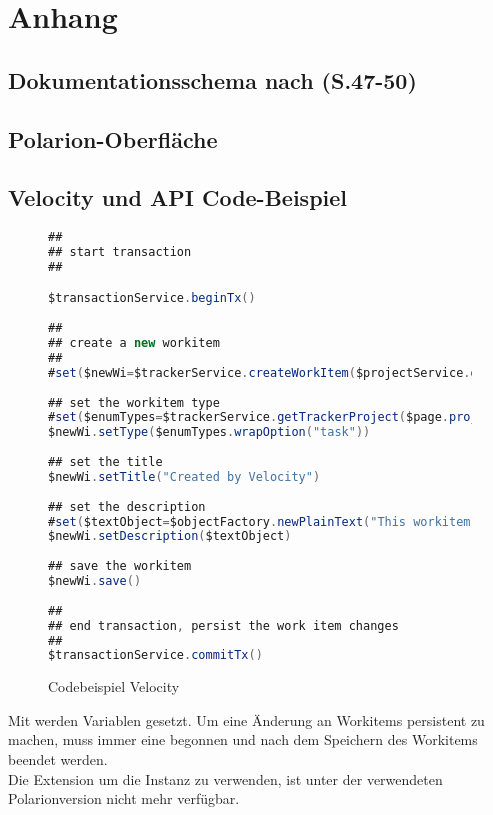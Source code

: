 \appendix
{}
\chapter{Anhang}
%
\thispagestyle{empty}
\pagestyle{empty}
\begin{landscape}
\section{Dokumentationsschema nach \cite{12}(S.47-50)}
\label{sec:schema}
\section{Polarion-Oberfläche}
\label{sec:polarionui}
\end{landscape}
\section{Velocity und API Code-Beispiel}
\label{sec:veloapi}
\begin{figure}[H]
\begin{lstlisting}[language=Java]
## 
## start transaction 
## 

$transactionService.beginTx() 
  
## 
## create a new workitem 
## 
#set($newWi=$trackerService.createWorkItem($projectService.getProject($page.project))) 
  
## set the workitem type 
#set($enumTypes=$trackerService.getTrackerProject($page.project).workItemTypeEnum) 
$newWi.setType($enumTypes.wrapOption("task")) 
  
## set the title 
$newWi.setTitle("Created by Velocity") 
  
## set the description 
#set($textObject=$objectFactory.newPlainText("This workitem was created by Velocity")) 
$newWi.setDescription($textObject) 
  
## save the workitem 
$newWi.save() 
  
## 
## end transaction, persist the work item changes 
## 
$transactionService.commitTx()
\end{lstlisting}
\caption{Codebeispiel Velocity}
\label{fig:bspvelo}
\end{figure} 
Mit  werden Variablen gesetzt. Um eine Änderung an Workitems persistent zu machen, muss immer eine  begonnen und nach dem Speichern des Workitems beendet werden.\\
Die Extension um die Instanz  zu verwenden, ist unter der verwendeten Polarionversion nicht mehr verfügbar.
